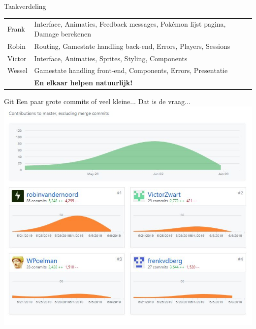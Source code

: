 \documentclass{beamer}
\begin{document}
\begin{frame}{Taakverdeling}
	\begin{table}
		\centering %
		\begin{tabular}{l l}
			Frank & {\tiny Interface, Animaties, Feedback messages, Pokémon lijst pagina, Damage berekenen}\\
			Robin & {\tiny Routing, Gamestate handling back-end, Errors, Players, Sessions}\\
			Victor & {\tiny Interface, Animaties, Sprites, Styling, Components}\\
			Wessel & {\tiny Gamestate handling front-end, Components, Errors, Presentatie}\\
			\midrule
			& \textbf{En elkaar helpen natuurlijk!} \\
			\bottomrule
		\end{tabular}
	\end{table}
\end{frame}


\begin{frame}{Git}
	\centering
	Een paar grote commits of veel kleine... Dat is de vraag...\\
	\bigskip
	\includegraphics[scale=0.3]{Images/git.jpg}
\end{frame}

\end{document}
